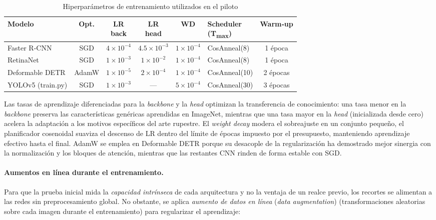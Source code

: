 \begin{table}[htbp]
\centering
\caption{Hiperparámetros de entrenamiento utilizados en el piloto}
\label{tab:pilot_hparams}

{\small
\setlength{\tabcolsep}{4pt}

\begin{tabular}{p{2.9cm} c c c c p{2.6cm} c}
\hline
\textbf{Modelo} &
\textbf{Opt.} &
\shortstack{\textbf{LR}\\\textbf{back}} &
\shortstack{\textbf{LR}\\\textbf{head}} &
\textbf{WD} &
\shortstack{\textbf{Scheduler}\\(T\textsubscript{max})} &
\textbf{Warm‑up} \\ \hline
Faster R‑CNN        & SGD   & $4\times10^{-4}$ & $4.5\times10^{-3}$ & $1\times10^{-4}$ & CosAnneal(8)  & 1 época  \\
RetinaNet           & SGD   & $1\times10^{-3}$ & $1\times10^{-2}$   & $1\times10^{-4}$ & CosAnneal(8)  & 1 época  \\
Deformable DETR     & AdamW & $1\times10^{-5}$ & $2\times10^{-4}$   & $1\times10^{-4}$ & CosAnneal(10) & 2 épocas \\
YOLOv5 (train.py)   & SGD   & $1\times10^{-3}$ & —                  & $5\times10^{-4}$ & CosAnneal(30) & 3 épocas \\ \hline
\end{tabular}}
\end{table}


\noindent
Las tasas de aprendizaje diferenciadas para la \emph{backbone} y la \emph{head} optimizan la transferencia de conocimiento: una tasa menor en la \emph{backbone} preserva las características genéricas aprendidas en ImageNet, mientras que una tasa mayor en la \emph{head} (inicializada desde cero) acelera la adaptación a los motivos específicos del arte rupestre.
El \textit{weight decay} modera el sobreajuste en un conjunto pequeño, el planificador cosenoidal suaviza el descenso de LR dentro del límite de épocas impuesto por el presupuesto, manteniendo aprendizaje efectivo hasta el final.
AdamW se emplea en Deformable DETR porque su desacople de la regularización ha demostrado mejor sinergia con la normalización y los bloques de atención, mientras que las restantes CNN rinden de forma estable con SGD.

\paragraph{Aumentos en línea durante el entrenamiento.}
Para que la prueba inicial mida la \textit{capacidad intrínseca} de cada arquitectura y no la ventaja de un realce previo, los recortes se alimentan a las redes sin preprocesamiento global.
No obstante, se aplica \emph{aumento de datos en línea} (\textit{data augmentation}) (transformaciones aleatorias sobre cada imagen durante el entrenamiento) para regularizar el aprendizaje:


